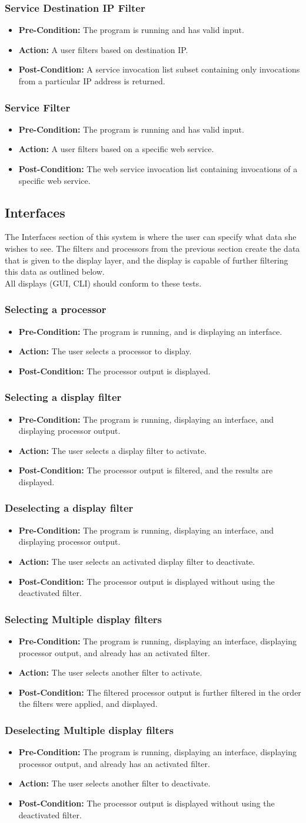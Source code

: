 \documentclass[titlepage]{article}
\newcommand{\testentry}[4]{
    \subsubsection{#1}
    \begin{itemize}
        \item \textbf{Pre-Condition:} #2
        \item \textbf{Action:} #3
        \item \textbf{Post-Condition:} #4
    \end{itemize}
    \vspace{0.5em}
}
\begin{document}
\testentry{Service Destination IP Filter}{
    The program is running and has valid input.
}{
    A user filters based on destination IP.
}{
    A service invocation list subset containing only invocations from a
    particular IP address is returned.
}

\testentry{Service Filter}{
    The program is running and has valid input.
}{
    A user filters based on a specific web service.
}{
    The web service invocation list containing invocations of a specific web
    service.
}

\subsection{Interfaces}

The Interfaces section of this system is where the user can specify what data
she wishes to see.  The filters and processors from the previous section create
the data that is given to the display layer, and the display is capable of
further filtering this data as outlined below.
\\
All displays (GUI, CLI) should conform to these tests.

\testentry{Selecting a processor}{
    The program is running, and is displaying an interface.
}{
    The user selects a processor to display.
}{
    The processor output is displayed.
}

\testentry{Selecting a display filter}{
    The program is running, displaying an interface, and displaying processor
    output.
}{
    The user selects a display filter to activate.
}{
    The processor output is filtered, and the results are displayed.
}

\testentry{Deselecting a display filter}{
    The program is running, displaying an interface, and displaying processor
    output.
}{
    The user selects an activated display filter to deactivate.
}{
    The processor output is displayed without using the deactivated filter.
}

\testentry{Selecting Multiple display filters}{
    The program is running, displaying an interface, displaying processor output,
    and already has an activated filter.
}{
    The user selects another filter to activate.
}{
    The filtered processor output is further filtered in the order the filters
    were applied, and displayed.
}

\testentry{Deselecting Multiple display filters}{
    The program is running, displaying an interface, displaying processor output,
    and already has an activated filter.
}{
    The user selects another filter to deactivate.
}{
    The processor output is displayed without using the deactivated filter.
}
\end{document}
